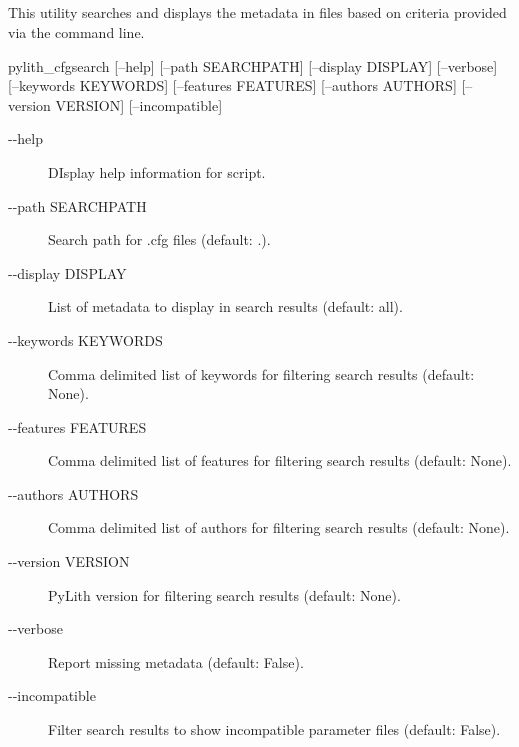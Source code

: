 \subsection{}

This utility searches and displays the metadata in  files based on criteria provided via the command line.

\begin{shell}
pylith_cfgsearch [--help] [--path SEARCHPATH] [--display DISPLAY] [--verbose] [--keywords KEYWORDS]
    [--features FEATURES] [--authors AUTHORS] [--version VERSION] [--incompatible]
\end{shell}

\begin{description}
\item[-{}-help] DIsplay help information for script.
\item[-{}-path SEARCHPATH] Search path for .cfg files (default: .).
\item[-{}-display DISPLAY] List of metadata to display in search results (default: all).
\item[-{}-keywords KEYWORDS] Comma delimited list of keywords for filtering search results (default: None).
\item[-{}-features FEATURES] Comma delimited list of features for filtering search results (default: None).
\item[-{}-authors AUTHORS] Comma delimited list of authors for filtering search results (default: None).
\item[-{}-version VERSION] PyLith version for filtering search results (default: None).
\item[-{}-verbose] Report missing metadata (default: False).
\item[-{}-incompatible] Filter search results to show incompatible parameter files (default: False).
\end{description}

